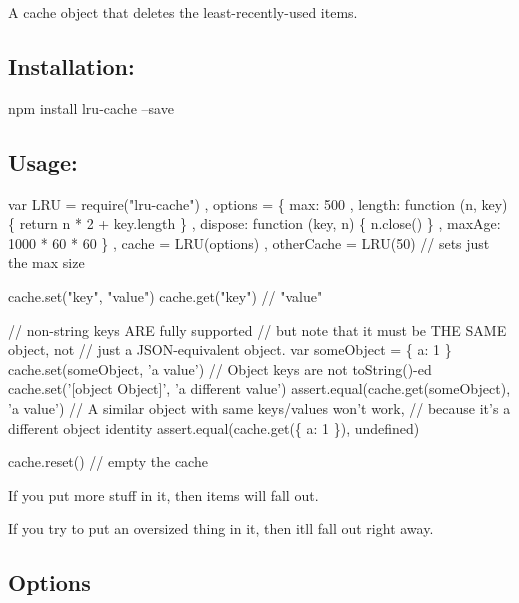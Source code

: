 A cache object that deletes the least-\/recently-\/used items.

\href{https://travis-ci.org/isaacs/node-lru-cache}{\tt } \href{https://coveralls.io/github/isaacs/node-lru-cache}{\tt }

\subsection*{Installation\+:}


\begin{DoxyCode}
npm install lru-cache --save
\end{DoxyCode}


\subsection*{Usage\+:}


\begin{DoxyCode}
var LRU = require("lru-cache")
  , options = \{ max: 500
              , length: function (n, key) \{ return n * 2 + key.length \}
              , dispose: function (key, n) \{ n.close() \}
              , maxAge: 1000 * 60 * 60 \}
  , cache = LRU(options)
  , otherCache = LRU(50) // sets just the max size

cache.set("key", "value")
cache.get("key") // "value"

// non-string keys ARE fully supported
// but note that it must be THE SAME object, not
// just a JSON-equivalent object.
var someObject = \{ a: 1 \}
cache.set(someObject, 'a value')
// Object keys are not toString()-ed
cache.set('[object Object]', 'a different value')
assert.equal(cache.get(someObject), 'a value')
// A similar object with same keys/values won't work,
// because it's a different object identity
assert.equal(cache.get(\{ a: 1 \}), undefined)

cache.reset()    // empty the cache
\end{DoxyCode}


If you put more stuff in it, then items will fall out.

If you try to put an oversized thing in it, then it\textquotesingle{}ll fall out right away.

\subsection*{Options}


